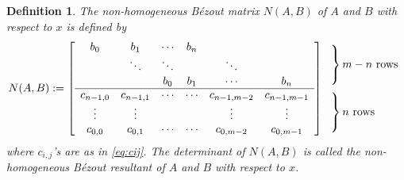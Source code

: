 \documentclass{article}
\newtheorem{definition}[theorem]{Definition}
\begin{document}
\begin{definition}
  The non-homogeneous B\'ezout matrix $N(A,B)$ of $A$ and $B$ with respect to $x$ is defined by
$$
N({A},{B}): = \left[ {\begin{array}{*{20}{c}}
{{b_{0}}}&b_1 &\cdots &{{b_{n}}}&{}\\
{}& \ddots &\ddots&& \ddots &{}\\
{}&{}&{{b_{0}}}& b_1&\cdots &{{b_{n}}}\\
\hline
{c_{n-1,0}}&{c_{n-1,1}}& \cdots &\cdots &{c_{n-1,{m} - 2}}&{c_{n-1,{m} - 1}}\\
 \vdots & \vdots &{}&& \vdots & \vdots \\
{c_{0,0}}&{c_{0,1}}& \cdots &\cdots &{c_{0,{m} - 2}}&{c_{0,{m} - 1}}
\end{array}} \right]
\hspace{-1em}
\begin{array}{l}
\left.
\begin{array}{l}
\\[25pt]
\end{array}
\right\}m-n\text{~rows}\\[18pt]
\left.
\begin{array}{l}
\\[25pt]
\end{array}
\right\}n\text{~rows}
\end{array}$$
where ${c_{i,j}}$'s are as in \eqref{eq:cij}. The determinant of ${N}(A,{B})$ is called the non-homogeneous B\'ezout resultant of $A$ and $B$ with respect to $x$.

\end{definition}
\end{document}
